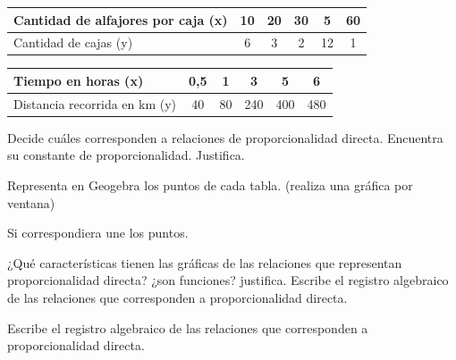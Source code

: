 \documentclass[oneside,spanish]{amsart}
\numberwithin{equation}{section}
\numberwithin{figure}{section}
\begin{document}
\begin{description}[itemsep=10pt]
    \begin{table}[h]
        \centering
        \begin{tabular}{|l|c|c|c|c|c|}\hline
            Cantidad de alfajores por caja (x) & 10 & 20 & 30 & 5 & 60 \\\hline
            Cantidad de cajas (y) & 6 & 3 & 2 & 12 & 1 \\ \hline
        \end{tabular}
        \label{tab:tabla-alfajores-por-caja}
    \end{table}
    
    \begin{table}[H]
        \centering
        \begin{tabular}{|l|c|c|c|c|c|}\hline
            Tiempo en horas (x) & 0,5 & 1 & 3 & 5 & 6 \\\hline
            Distancia recorrida en km  (y) & 40 & 80 & 240 & 400 & 480 \\ \hline
        \end{tabular}
        \label{tab:tabla-tiempo-distancia}
    \end{table}

    Decide cuáles corresponden a relaciones de proporcionalidad directa. Encuentra su constante de proporcionalidad. Justifica.
    
    Representa en Geogebra los puntos de cada tabla. (realiza una gráfica por ventana)

    Si correspondiera une los puntos.
    
    ¿Qué características tienen las gráficas de las relaciones que representan proporcionalidad directa? ¿son funciones? justifica.
    Escribe el registro algebraico de las relaciones que corresponden a proporcionalidad directa.

    Escribe el registro algebraico de las relaciones que corresponden a proporcionalidad directa.


\end{description}
\end{document}
